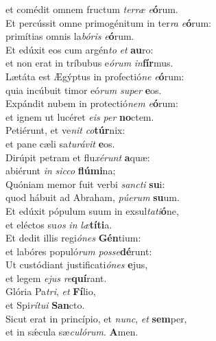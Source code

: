 \evenverse et comédit omnem fructum \textit{ter}\textit{ræ} \textit{e}\textbf{ó}rum.\\
\oddverse Et percússit omne primogénitum in ter\textit{ra} \textit{e}\textbf{ó}rum:~\*\\
\oddverse primítias omnis la\textit{bó}\textit{ris} \textit{e}\textbf{ó}rum.\\
\evenverse Et edúxit eos cum argén\textit{to} \textit{et} \textbf{au}ro:~\*\\
\evenverse et non erat in tríbubus e\textit{ó}\textit{rum} \textit{in}\textbf{fír}mus.\\
\oddverse Lætáta est Ægýptus in profectió\textit{ne} \textit{e}\textbf{ó}rum:~\*\\
\oddverse quia incúbuit timor eó\textit{rum} \textit{su}\textit{per} \textbf{e}os.\\
\evenverse Expándit nubem in protectió\textit{nem} \textit{e}\textbf{ó}rum:~\*\\
\evenverse et ignem ut lucéret \textit{e}\textit{is} \textit{per} \textbf{no}ctem.\\
\oddverse Petiérunt, et ve\textit{nit} \textit{co}\textbf{túr}nix:~\*\\
\oddverse et pane cæli sa\textit{tu}\textit{rá}\textit{vit} \textbf{e}os.\\
\evenverse Dirúpit petram et flu\textit{xé}\textit{runt} \textbf{a}quæ:~\*\\
\evenverse abiérunt \textit{in} \textit{sic}\textit{co} \textbf{flú}\textbf{mi}na;\\
\oddverse Quóniam memor fuit verbi \textit{san}\textit{cti} \textbf{su}i:~\*\\
\oddverse quod hábuit ad Abraham, \textit{pú}\textit{e}\textit{rum} \textbf{su}um.\\
\evenverse Et edúxit pópulum suum in exsul\textit{ta}\textit{ti}\textbf{ó}ne,~\*\\
\evenverse et eléctos su\textit{os} \textit{in} \textit{læ}\textbf{tí}\textbf{ti}a.\\
\oddverse Et dedit illis regi\textit{ó}\textit{nes} \textbf{Gén}tium:~\*\\
\oddverse et labóres populó\textit{rum} \textit{pos}\textit{se}\textbf{dé}runt:\\
\evenverse Ut custódiant justificati\textit{ó}\textit{nes} \textbf{e}jus,~\*\\
\evenverse et legem \textit{e}\textit{jus} \textit{re}\textbf{quí}rant.\\
\oddverse Glória Pa\textit{tri}, \textit{et} \textbf{Fí}lio,~\*\\
\oddverse et Spi\textit{rí}\textit{tu}\textit{i} \textbf{San}cto.\\
\evenverse Sicut erat in princípio, et \textit{nunc}, \textit{et} \textbf{sem}per,~\*\\
\evenverse et in sǽcula sæ\textit{cu}\textit{ló}\textit{rum}. \textbf{A}men.\\
